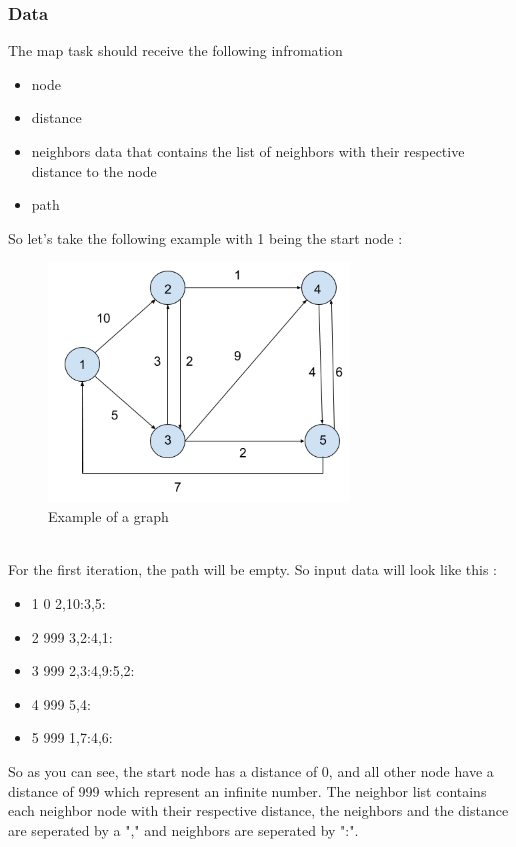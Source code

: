 \documentclass[english]{article}
\begin{document}
\subsubsection{Data}
The map task should receive the following infromation
\begin{itemize}
\item node
\item distance
\item neighbors data that contains the list of neighbors with their respective distance to the node
\item path
\end{itemize}
So let's take the following example with 1 being the start node :
\begin{figure}[h]
\centering
\includegraphics[width=8cm]{img/data-example.png}
\caption{Example of a graph}
\end{figure}
\\
For the first iteration, the path will be empty. So input data will look like this :
\begin{itemize}
\item 1 0 2,10:3,5:
\item 2 999 3,2:4,1:
\item 3 999 2,3:4,9:5,2: 
\item 4 999 5,4:
\item 5 999 1,7:4,6:
\end{itemize}
So as you can see, the start node has a distance of 0, and all other node have a distance of 999 which represent an infinite number. The neighbor list contains each neighbor node with their respective distance, the neighbors and the distance are seperated by a "," and neighbors are seperated by ":".
\end{document}
